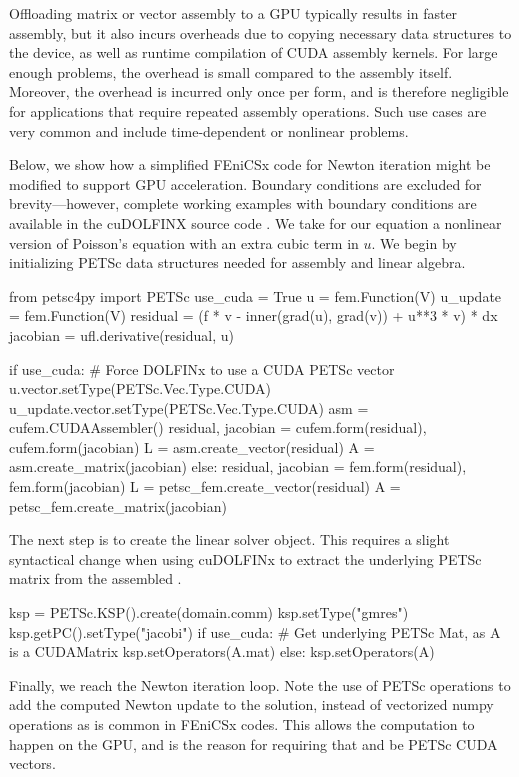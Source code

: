 Offloading matrix or vector assembly to a GPU typically results in faster assembly, but it also incurs overheads due to copying necessary data structures to the device, as well as runtime compilation of CUDA assembly kernels. For large enough problems, the overhead is small compared to the assembly itself. Moreover, the overhead is incurred only once per form, and is therefore negligible for applications that require repeated assembly operations. Such use cases are very common and include time-dependent or nonlinear problems.

Below, we show how a simplified FEniCSx code for Newton iteration might be modified to support GPU acceleration. Boundary conditions are excluded for brevity---however, complete working examples with boundary conditions are available in the cuDOLFINX source code \citep{cudolfinxzenodo}. We take for our equation a nonlinear version of Poisson's equation with an extra cubic term in $u$. We begin by initializing PETSc data structures needed for assembly and linear algebra.
\begin{python}
from petsc4py import PETSc
use_cuda = True
u = fem.Function(V)
u_update = fem.Function(V)
residual = (f * v - inner(grad(u), grad(v)) + u**3 * v) * dx
jacobian = ufl.derivative(residual, u)

if use_cuda:
  # Force DOLFINx to use a CUDA PETSc vector
  u.vector.setType(PETSc.Vec.Type.CUDA)
  u_update.vector.setType(PETSc.Vec.Type.CUDA)
  asm = cufem.CUDAAssembler()
  residual, jacobian = cufem.form(residual), cufem.form(jacobian)
  L = asm.create_vector(residual)
  A = asm.create_matrix(jacobian)
else:
  residual, jacobian = fem.form(residual), fem.form(jacobian)
  L = petsc_fem.create_vector(residual)
  A = petsc_fem.create_matrix(jacobian)
\end{python}
The next step is to create the linear solver object. This requires a slight syntactical change when using cuDOLFINx to extract the underlying PETSc matrix from the assembled .
\begin{python}
ksp = PETSc.KSP().create(domain.comm)
ksp.setType("gmres")
ksp.getPC().setType("jacobi")
if use_cuda:
  # Get underlying PETSc Mat, as A is a CUDAMatrix
  ksp.setOperators(A.mat)
else:
  ksp.setOperators(A)
\end{python}
Finally, we reach the Newton iteration loop. Note the use of PETSc operations to add the computed Newton update to the solution, instead of vectorized numpy operations as is common in FEniCSx codes. This allows the computation to happen on the GPU, and is the reason for requiring that  and  be PETSc CUDA vectors.

